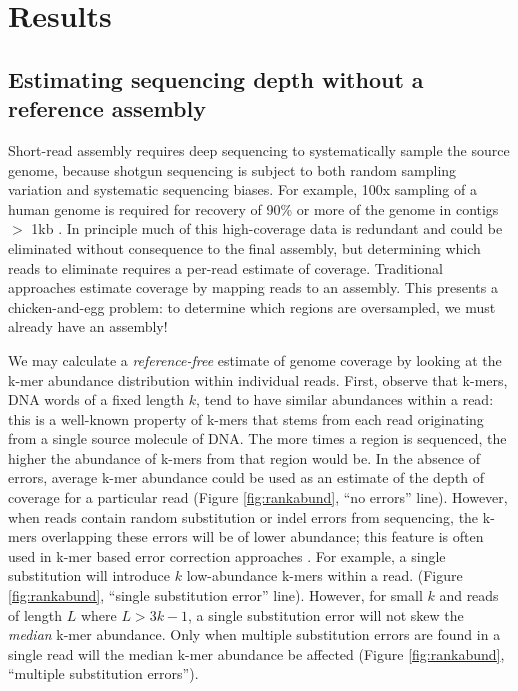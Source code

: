 \section{Results}

\subsection{Estimating sequencing depth without a reference assembly}

Short-read assembly requires deep sequencing to systematically sample
the source genome, because shotgun sequencing is subject to both
random sampling variation and systematic sequencing biases.  For
example, 100x sampling of a human genome is required for recovery of
90\% or more of the genome in contigs $>$ 1kb \cite{pubmed21187386}.
In principle much of this high-coverage data is redundant and could be
eliminated without consequence to the final assembly, but determining
which reads to eliminate requires a per-read estimate of coverage.
Traditional approaches estimate coverage by mapping reads to an
assembly.  This presents a chicken-and-egg problem: to
determine which regions are oversampled, we must already have an
assembly!

We may calculate a {\em reference-free} estimate of genome coverage by
looking at the k-mer abundance distribution within individual reads.
First, observe that k-mers, DNA words of a fixed length $k$, tend to
have similar abundances within a read: this is a well-known property
of k-mers that stems from each read originating from a single source
molecule of DNA.  The more times a region is sequenced, the higher the
abundance of k-mers from that region would be.  In the absence of
errors, average k-mer abundance could be used as an estimate of the
depth of coverage for a particular read (Figure \ref{fig:rankabund},
``no errors'' line).  However, when reads contain random substitution
or indel errors from sequencing, the k-mers overlapping these errors
will be of lower abundance; this feature is often used in k-mer based
error correction approaches \cite{pubmed21114842}.  For example, a
single substitution will introduce $k$ low-abundance k-mers within a
read.  (Figure \ref{fig:rankabund}, ``single substitution error''
line).  However, for small $k$ and reads of length $L$ where $L >
3k-1$, a single substitution error will not skew the {\em median}
k-mer abundance.  Only when multiple substitution errors are found in
a single read will the median k-mer abundance be affected (Figure
\ref{fig:rankabund}, ``multiple substitution errors'').

